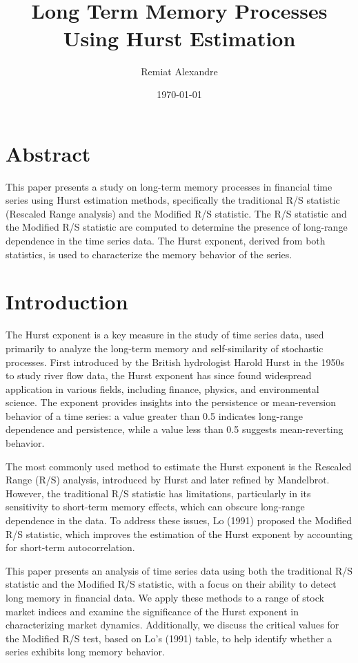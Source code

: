 \documentclass[11pt]{extarticle}
\title{
    \hspace*{-12cm}
    \vspace*{1cm}
    \protect\\
    \vspace*{1cm}
    \textbf{Long Term Memory Processes Using Hurst Estimation}
}
\author{Remiat Alexandre}
\date{\today}
\begin{document}

\maketitle


\newpage


\section*{Abstract}

This paper presents a study on long-term memory processes in financial time series using Hurst estimation methods, specifically the traditional R/S statistic (Rescaled Range analysis) and the Modified R/S statistic.
The R/S statistic and the Modified R/S statistic are computed to determine the presence of long-range dependence in the time series data. The Hurst exponent, derived from both statistics, is used to characterize the memory behavior of the series.


\newpage

\section{Introduction}

The Hurst exponent is a key measure in the study of time series data, used primarily to analyze the long-term memory and self-similarity of stochastic processes. First introduced by the British hydrologist Harold Hurst in the 1950s to study river flow data, the Hurst exponent has since found widespread application in various fields, including finance, physics, and environmental science. The exponent provides insights into the persistence or mean-reversion behavior of a time series: a value greater than 0.5 indicates long-range dependence and persistence, while a value less than 0.5 suggests mean-reverting behavior.

The most commonly used method to estimate the Hurst exponent is the Rescaled Range (R/S) analysis, introduced by Hurst and later refined by Mandelbrot. However, the traditional R/S statistic has limitations, particularly in its sensitivity to short-term memory effects, which can obscure long-range dependence in the data. To address these issues, Lo (1991) proposed the Modified R/S statistic, which improves the estimation of the Hurst exponent by accounting for short-term autocorrelation.

This paper presents an analysis of time series data using both the traditional R/S statistic and the Modified R/S statistic, with a focus on their ability to detect long memory in financial data. We apply these methods to a range of stock market indices and examine the significance of the Hurst exponent in characterizing market dynamics. Additionally, we discuss the critical values for the Modified R/S test, based on Lo’s (1991) table, to help identify whether a series exhibits long memory behavior.
\end{document}
